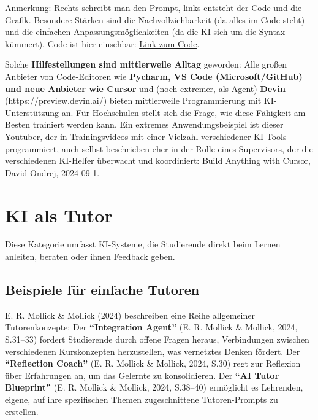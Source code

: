 \documentclass[
  ngerman,
  letterpaper,
  DIV=11]{scrreprt}
\begin{document}
Anmerkung: Rechts schreibt man den Prompt, links entsteht der Code und
die Grafik. Besondere Stärken sind die Nachvollziehbarkeit (da alles im
Code steht) und die einfachen Anpassungsmöglichkeiten (da die KI sich um
die Syntax kümmert). Code ist hier einsehbar:
\href{https://colab.research.google.com/drive/1mFJWvghahGor87gwkNZAqPYoejD3KDwK?usp=sharing}{Link
zum Code}.

Solche \textbf{Hilfestellungen sind mittlerweile Alltag} geworden: Alle
großen Anbieter von Code-Editoren wie \textbf{Pycharm, VS Code
(Microsoft/GitHub) und neue Anbieter wie Cursor} und (noch extremer, als
Agent) \textbf{Devin} (https://preview.devin.ai/) bieten mittlerweile
Programmierung mit KI-Unterstützung an. Für Hochschulen stellt sich die
Frage, wie diese Fähigkeit am Besten trainiert werden kann. Ein extremes
Anwendungsbeispiel ist dieser Youtuber, der in Trainingsvideos mit einer
Vielzahl verschiedener KI-Tools programmiert, auch selbst beschrieben
eher in der Rolle eines Supervisors, der die verschiedenen KI-Helfer
überwacht und koordiniert:
\href{https://www.youtube.com/watch?v=C59LC1WJIbE}{Build Anything with
Cursor, David Ondrej, 2024-09-1}.

\section{KI als Tutor}\label{sec-tutor}

Diese Kategorie umfasst KI-Systeme, die Studierende direkt beim Lernen
anleiten, beraten oder ihnen Feedback geben.

\subsection{Beispiele für einfache Tutoren}\label{sec-simple-tutors}

E. R. Mollick \& Mollick (2024) beschreiben eine Reihe allgemeiner
Tutorenkonzepte: Der \textbf{``Integration Agent''} (E. R. Mollick \&
Mollick, 2024, S.31--33) fordert Studierende durch offene Fragen heraus,
Verbindungen zwischen verschiedenen Kurskonzepten herzustellen, was
vernetztes Denken fördert. Der \textbf{``Reflection Coach''} (E. R.
Mollick \& Mollick, 2024, S.30) regt zur Reflexion über Erfahrungen an,
um das Gelernte zu konsolidieren. Der \textbf{``AI Tutor Blueprint''}
(E. R. Mollick \& Mollick, 2024, S.38--40) ermöglicht es Lehrenden,
eigene, auf ihre spezifischen Themen zugeschnittene Tutoren-Prompts zu
erstellen.
\end{document}
